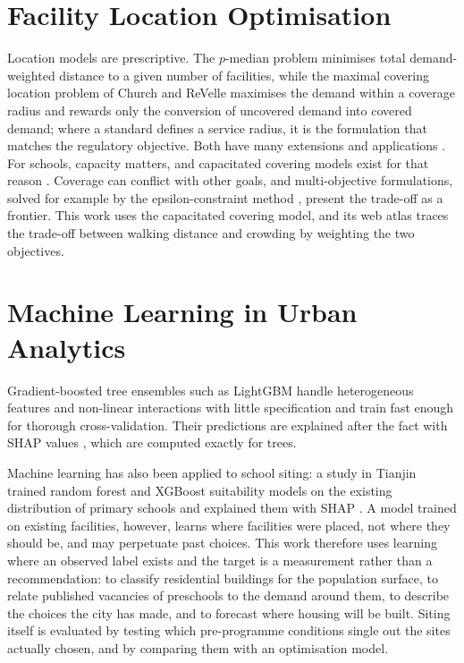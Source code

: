 \section{Facility Location Optimisation}
\label{sec:location-models}

Location models are prescriptive. The $p$-median problem minimises total demand-weighted distance to a given number of facilities, while the maximal covering location problem of Church and ReVelle \cite{church1974} maximises the demand within a coverage radius and rewards only the conversion of uncovered demand into covered demand; where a standard defines a service radius, it is the formulation that matches the regulatory objective. Both have many extensions and applications \cite{murray2016}. For schools, capacity matters, and capacitated covering models exist for that reason \cite{current1988}. Coverage can conflict with other goals, and multi-objective formulations, solved for example by the epsilon-constraint method \cite{mavrotas2009}, present the trade-off as a frontier. This work uses the capacitated covering model, and its web atlas traces the trade-off between walking distance and crowding by weighting the two objectives.

\section{Machine Learning in Urban Analytics}
\label{sec:ml-urban}

Gradient-boosted tree ensembles such as LightGBM \cite{ke2017} handle heterogeneous features and non-linear interactions with little specification and train fast enough for thorough cross-validation. Their predictions are explained after the fact with SHAP values \cite{lundberg2017}, which are computed exactly for trees.

Machine learning has also been applied to school siting: a study in Tianjin trained random forest and XGBoost suitability models on the existing distribution of primary schools and explained them with SHAP \cite{tianjin2025}. A model trained on existing facilities, however, learns where facilities were placed, not where they should be, and may perpetuate past choices. This work therefore uses learning where an observed label exists and the target is a measurement rather than a recommendation: to classify residential buildings for the population surface, to relate published vacancies of preschools to the demand around them, to describe the choices the city has made, and to forecast where housing will be built. Siting itself is evaluated by testing which pre-programme conditions single out the sites actually chosen, and by comparing them with an optimisation model.

